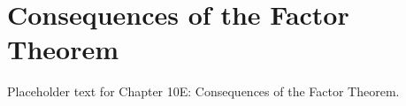 \section{Consequences of the Factor Theorem}
Placeholder text for Chapter 10E: Consequences of the Factor Theorem.
